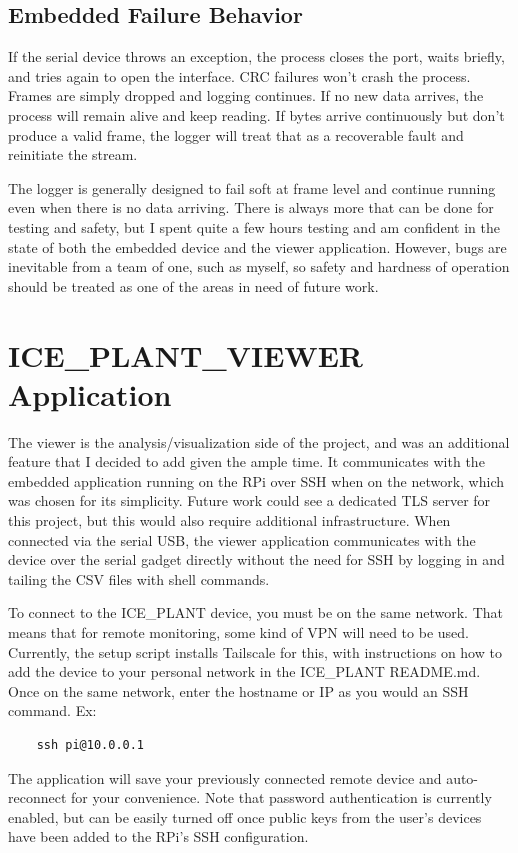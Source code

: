 \documentclass[11pt]{article}
\begin{document}
\subsection*{Embedded Failure Behavior}
If the serial device throws an exception, the process closes the port, waits briefly, and tries again to open the interface. CRC failures won't crash the process. Frames are simply dropped and logging continues. If no new data arrives, the process will remain alive and keep reading. If bytes arrive continuously but don't produce a valid frame, the logger will treat that as a recoverable fault and reinitiate the stream.

The logger is generally designed to fail soft at frame level and continue running even when there is no data arriving. There is always more that can be done for testing and safety, but I spent quite a few hours testing and am confident in the state of both the embedded device and the viewer application. However, bugs are inevitable from a team of one, such as myself, so safety and hardness of operation should be treated as one of the areas in need of future work. 

\section{ICE\_PLANT\_VIEWER Application}
The viewer is the analysis/visualization side of the project, and was an additional feature that I decided to add given the ample time. It communicates with the embedded application running on the RPi over SSH when on the network, which was chosen for its simplicity. Future work could see a dedicated TLS server for this project, but this would also require additional infrastructure. When connected via the serial USB, the viewer application communicates with the device over the serial gadget directly without the need for SSH by logging in and tailing the CSV files with shell commands.

To connect to the ICE\_PLANT device, you must be on the same network. That means that for remote monitoring, some kind of VPN will need to be used. Currently, the setup script installs Tailscale for this, with instructions on how to add the device to your personal network in the ICE\_PLANT README.md. Once on the same network, enter the hostname or IP as you would an SSH command. Ex:

\begin{verbatim}
    ssh pi@10.0.0.1
\end{verbatim}
The application will save your previously connected remote device and auto-reconnect for your convenience. Note that password authentication is currently enabled, but can be easily turned off once public keys from the user's devices have been added to the RPi's SSH configuration. 
\end{document}

